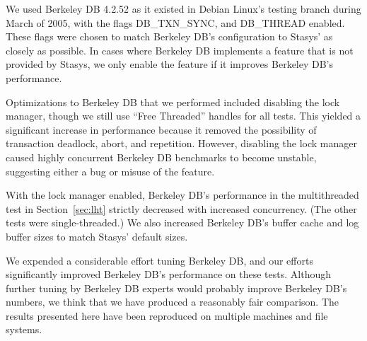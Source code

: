 \documentclass[letterpaper,twocolumn,10pt]{article}
\newcommand{\yad}{Stasys\xspace}
\newcommand{\yads}{Stasys'\xspace}
\begin{document}
We used Berkeley DB 4.2.52 as it existed in Debian Linux's testing
branch during March of 2005, with the flags DB\_TXN\_SYNC, and
DB\_THREAD enabled. These flags were chosen to match Berkeley DB's
configuration to \yads as closely as possible.  In cases where
Berkeley DB implements a feature that is not provided by \yad, we
only enable the feature if it improves Berkeley DB's performance.

Optimizations to Berkeley DB that we performed included disabling the
lock manager, though we still use ``Free Threaded'' handles for all
tests.  This yielded a significant increase in performance because it
removed the possibility of transaction deadlock, abort, and
repetition.  However, disabling the lock manager caused highly
concurrent Berkeley DB benchmarks to become unstable, suggesting either a
bug or misuse of the feature.  

With the lock manager enabled, Berkeley
DB's performance in the multithreaded test in Section~\ref{sec:lht} strictly decreased with
increased concurrency.  (The other tests were single-threaded.)  We also
increased Berkeley DB's buffer cache and log buffer sizes to match
\yads default sizes.

We expended a considerable effort tuning Berkeley DB, and our efforts
significantly improved Berkeley DB's performance on these tests.
Although further tuning by Berkeley DB experts would probably improve
Berkeley DB's numbers, we think that we have produced a reasonably
fair comparison.  The results presented here have been reproduced on
multiple machines and file systems.
\end{document}
